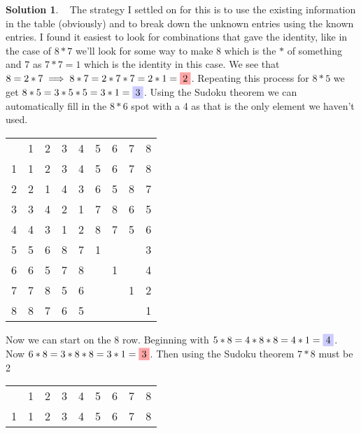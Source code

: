 \documentclass[10pt]{article}
\theoremstyle{definition}
\newtheorem{soln}{Solution}
\begin{document}
\begin{soln}~
  The strategy I settled on for this is to use the existing information in the table (obviously) and to break
  down the unknown entries using the known entries. I found it easiest to look for
  combinations that gave the identity, like in the case of $8* 7$ we'll look for
  some way to make 8 which is the $*$ of something and $7$ as $7*7=1$ which is the identity in this case.
  We see that $8=2*7\implies 8*7=2*7*7=2*1=\colorbox{red!35!white}{2}$.
  Repeating this process for $8*5$ we get $8*5=3*5*5=3*1=\colorbox{blue!20!white}{3}$. Using the Sudoku theorem
  we can automatically fill in the $8*6$ spot with a \colorbox{green!50!white}{4} as that is the only element we haven't used.
  \begin{center}
    \begin{tabular}{c | c c c c c c c c}
      ~ & 1 & 2 & 3 & 4 & 5 & 6 & 7 & 8                            \\
      \cline{1-9}
      1 & 1 & 2 & 3 & 4 & 5 & 6 & 7 & 8                            \\
      2 & 2 & 1 & 4 & 3 & 6 & 5 & 8 & 7                            \\
      3 & 3 & 4 & 2 & 1 & 7 & 8 & 6 & 5                            \\
      4 & 4 & 3 & 1 & 2 & 8 & 7 & 5 & 6                            \\
      5 & 5 & 6 & 8 & 7 & 1 &   &   & \colorbox{blue!20!white}{3}  \\
      6 & 6 & 5 & 7 & 8 &   & 1 &   & \colorbox{green!50!white}{4} \\
      7 & 7 & 8 & 5 & 6 &   &   & 1 & \colorbox{red!35!white}{2}   \\
      8 & 8 & 7 & 6 & 5 &   &   &   & 1
    \end{tabular}
  \end{center}
  Now we can start on the $8$ row. Beginning with $5*8=4*8*8=4*1=\colorbox{blue!20!white}{4}$.
  Now $6*8=3*8*8=3*1=\colorbox{red!35!white}{3}$. Then using the Sudoku theorem $7*8$ must be
  \colorbox{green!50!white}{2}
  \begin{center}
    \begin{tabular}{c | c c c c c c c c}
      ~ & 1 & 2 & 3 & 4 & 5                           & 6                          & 7                            & 8 \\
      \cline{1-9}
      1 & 1 & 2 & 3 & 4 & 5                           & 6                          & 7                            & 8 \\

\end{tabular}
\end{center}
\end{soln}
\end{document}
